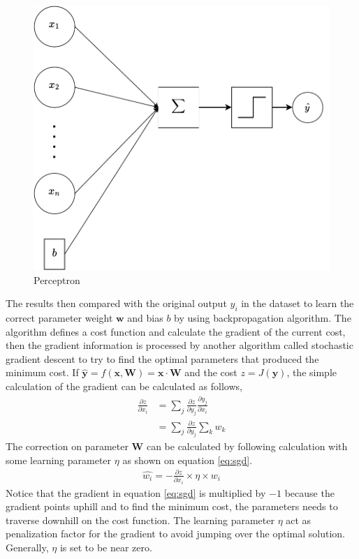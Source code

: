     \begin{figure}
        \centering
        \includegraphics[width=.5\linewidth]{images/perceptron.pdf}
        \caption{Perceptron}
        \label{fig:perceptron}
    \end{figure}
    
    The results then compared with the original output $y_i$ in the
    dataset to learn the correct parameter weight $\mathbf{w}$ and
    bias $b$ by using backpropagation algorithm. The algorithm defines
    a cost function and calculate the gradient of the current cost,
    then the gradient information is processed by another algorithm
    called stochastic gradient descent to try to find the optimal
    parameters that produced the minimum cost. If $\mathbf{\hat{y}} =
    f(\mathbf{x}, \mathbf{W}) = \mathbf{x} \cdot \mathbf{W}$ and the
    cost $z = J(\mathbf{y})$, the simple calculation of the gradient
    can be calculated as follows,
    \begin{align}
        \label{eq:gradient1}
        \frac{\partial z}{\partial x_i} &= \sum_j \frac{\partial z}{\partial y_j} \frac{\partial y_j}{\partial x_i}\\
        \label{eq:gradient2}        
        &= \sum_j \frac{\partial z}{\partial y_j} \sum_k w_k
    \end{align}
    The correction on parameter $\mathbf{W}$ can be calculated by
    following calculation with some learning parameter $\eta$ as shown
    on equation \ref{eq:sgd}.
    \begin{align}
        \label{eq:sgd}
        \hat{w_i} = -\frac{\partial z}{\partial x_i} \times \eta \times w_i
    \end{align}
    Notice that the gradient in equation \ref{eq:sgd} is multiplied by
    $-1$ because the gradient points uphill and to find the minimum
    cost, the parameters needs to traverse downhill on the cost
    function. The learning parameter $\eta$ act as penalization factor
    for the gradient to avoid jumping over the optimal solution.
    Generally, $\eta$ is set to be near zero.
    
